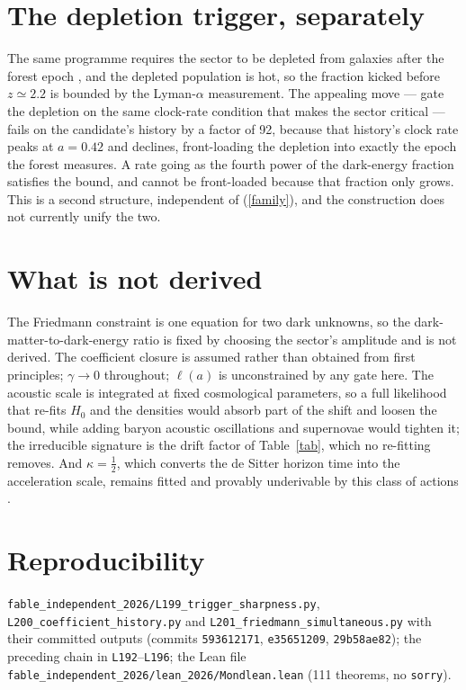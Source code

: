 \documentclass[11pt,letterpaper]{article}
\begin{document}
\section{The depletion trigger, separately}
The same programme requires the sector to be depleted from galaxies after the forest epoch \cite{paper18}, and the depleted population is hot, so the fraction kicked before $z\simeq2.2$ is bounded by the Lyman-$\alpha$ measurement. The appealing move --- gate the depletion on the same clock-rate condition that makes the sector critical --- fails on the candidate's history by a factor of 92, because that history's clock rate peaks at $a=0.42$ and declines, front-loading the depletion into exactly the epoch the forest measures. A rate going as the fourth power of the dark-energy fraction satisfies the bound, and cannot be front-loaded because that fraction only grows. This is a second structure, independent of (\ref{family}), and the construction does not currently unify the two.

\section{What is not derived}
The Friedmann constraint is one equation for two dark unknowns, so the dark-matter-to-dark-energy ratio is fixed by choosing the sector's amplitude and is not derived. The coefficient closure is assumed rather than obtained from first principles; $\gamma\to0$ throughout; $\ell(a)$ is unconstrained by any gate here. The acoustic scale is integrated at fixed cosmological parameters, so a full likelihood that re-fits $H_0$ and the densities would absorb part of the shift and loosen the bound, while adding baryon acoustic oscillations and supernovae would tighten it; the irreducible signature is the drift factor of Table~\ref{tab}, which no re-fitting removes. And $\kappa=\tfrac12$, which converts the de Sitter horizon time into the acceleration scale, remains fitted and provably underivable by this class of actions \cite{repo}.

\section{Reproducibility}
\texttt{fable\_independent\_2026/L199\_trigger\_sharpness.py}, \texttt{L200\_coefficient\_history.py} and \texttt{L201\_friedmann\_simultaneous.py} with their committed outputs (commits \texttt{593612171}, \texttt{e35651209}, \texttt{29b58ae82}); the preceding chain in \texttt{L192}--\texttt{L196}; the Lean file \texttt{fable\_independent\_2026/lean\_2026/Mondlean.lean} (111 theorems, no \texttt{sorry}).
\end{document}
